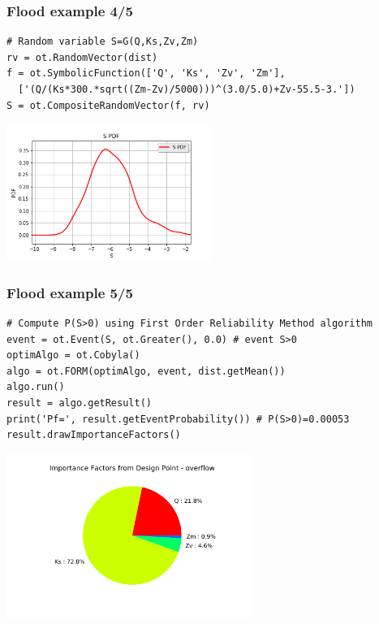 \documentclass{beamer}
\begin{document}
\begin{frame}[containsverbatim]
\frametitle{Flood example 4/5}

\lstset{language=python}
\begin{lstlisting}
# Random variable S=G(Q,Ks,Zv,Zm)
rv = ot.RandomVector(dist)
f = ot.SymbolicFunction(['Q', 'Ks', 'Zv', 'Zm'],
  ['(Q/(Ks*300.*sqrt((Zm-Zv)/5000)))^(3.0/5.0)+Zv-55.5-3.'])
S = ot.CompositeRandomVector(f, rv)
\end{lstlisting}

\begin{center}
\includegraphics[width=0.5\textwidth]{figures/s_dist}
\end{center}

\end{frame}








\begin{frame}[containsverbatim]
\frametitle{Flood example 5/5}

\lstset{language=python}
\begin{lstlisting}
# Compute P(S>0) using First Order Reliability Method algorithm
event = ot.Event(S, ot.Greater(), 0.0) # event S>0
optimAlgo = ot.Cobyla()
algo = ot.FORM(optimAlgo, event, dist.getMean())
algo.run()
result = algo.getResult()
print('Pf=', result.getEventProbability()) # P(S>0)=0.00053
result.drawImportanceFactors()
\end{lstlisting}

\begin{center}
\includegraphics[width=0.6\textwidth]{figures/imp_fact}
\end{center}

\end{frame}
\end{document}
